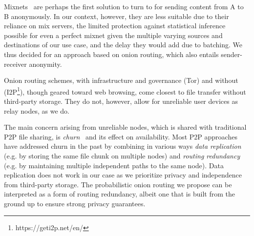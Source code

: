 Mixnets~\cite{Chaum:1981} are perhaps the first solution to turn to for sending content from A to B anonymously. In our context, however, they are less suitable due to their reliance on mix servers, the limited protection against statistical inference possible for even a perfect mixnet given the multiple varying sources and destinations of our use case, and the delay they would add due to batching. We thus decided for an approach based on onion routing, which also entails sender-receiver anonymity.

Onion routing schemes, with infrastructure and governance (Tor) and 
without (I2P\footnote{https://geti2p.net/en/}), though geared toward web 
browsing, come closest to file transfer without third-party storage. They do 
not, however, allow for unreliable user devices as relay nodes, as we do. 

The main concern arising from unreliable nodes, which is shared with traditional P2P file sharing, is \emph{churn}~\cite{dhtchurn} and its effect on availability. %
Most P2P approaches have addressed churn in the past by combining in various ways \emph{data replication} (e.g. by storing the same file chunk on multiple nodes) and \emph{routing redundancy} (e.g. by maintaining multiple independent paths to the same node). Data replication does not work in our case as we prioritize privacy and independence from third-party storage. The probabilistic onion routing we propose can be interpreted as a form of routing redundancy, albeit one that is built from the ground up to ensure strong privacy guarantees.





